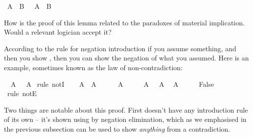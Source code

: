 \begin{isabellebody}
\isamarkupfalse%
\ {\isachardoublequoteopen}A\ {\isasymor}\ B\ {\isasymlongrightarrow}\ {\isasymnot}\ A\ {\isasymlongrightarrow}\ B{\isachardoublequoteclose}%
\isadelimproof
\ %
\endisadelimproof
%
\isatagproof
{}\isamarkupfalse%
%
\endisatagproof
{\isafoldproof}%
%
\isadelimproof
%
\endisadelimproof
%
\begin{isamarkuptext}%
How is the proof of this lemma related to the paradoxes of material implication. Would a
relevant logician accept it?%
\end{isamarkuptext}\isamarkuptrue%
%
\isamarkuptrue%
%
\begin{isamarkuptext}%
According to the rule for negation introduction if you assume something, and then you show
, then you can show the negation of what you assumed. Here is an example, sometimes
known as the law of non-contradiction:%
\end{isamarkuptext}\isamarkuptrue%
\isamarkupfalse%
\ {\isachardoublequoteopen}{\isasymnot}\ {\isacharparenleft}A\ {\isasymand}\ {\isasymnot}\ A{\isacharparenright}{\isachardoublequoteclose}\isanewline
%
\isadelimproof
%
\endisadelimproof
%
\isatagproof
{}\isamarkupfalse%
\ {\isacharparenleft}rule\ notI{\isacharparenright}\isanewline
\ \ \isamarkupfalse%
\ {\isachardoublequoteopen}A\ {\isasymand}\ {\isasymnot}A{\isachardoublequoteclose}\isanewline
\ \ \isamarkupfalse%
\ {\isachardoublequoteopen}\ {\isasymnot}\ A{\isachardoublequoteclose}\isacommand{{\isachardot}{\isachardot}}\isamarkupfalse%
\isanewline
\ \ \isamarkupfalse%
\ \isamarkupfalse%
\ {\isacharbackquoteopen}A\ {\isasymand}\ {\isasymnot}\ A{\isacharbackquoteclose}\ \isamarkupfalse%
\ {\isachardoublequoteopen}A{\isachardoublequoteclose}\isacommand{{\isachardot}{\isachardot}}\isamarkupfalse%
\isanewline
\ \ \isamarkupfalse%
\ \isamarkupfalse%
\ {\isachardoublequoteopen}False{\isachardoublequoteclose}\ \isamarkupfalse%
\ {\isacharparenleft}rule\ notE{\isacharparenright}\isanewline
{}\isamarkupfalse%
%
\endisatagproof
{\isafoldproof}%
%
\isadelimproof
%
\endisadelimproof
%
\begin{isamarkuptext}%
Two things are notable about this proof. First  doesn't have any introduction
rule of its own -- it's shown using by negation elimination, which as we emphasised in the previous
subsection can be used to show \emph{anything} from a contradiction.%

\end{isamarkuptext}
\end{isabellebody}
